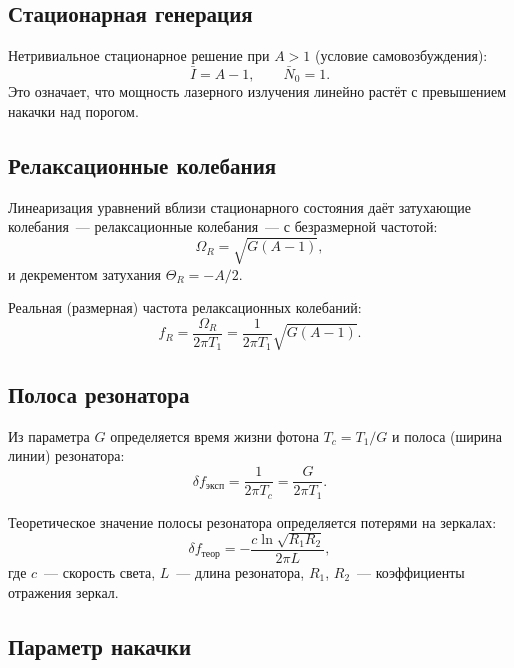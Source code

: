 \documentclass[12pt,a4paper]{article}
\begin{document}
\subsection{Стационарная генерация}

Нетривиальное стационарное решение при $A > 1$ (условие самовозбуждения):
\begin{equation}
  \bar{I} = A - 1, \qquad \bar{N}_0 = 1.
  \label{eq:stationary}
\end{equation}
Это означает, что мощность лазерного излучения линейно растёт с превышением
накачки над порогом.

\subsection{Релаксационные колебания}

Линеаризация уравнений вблизи стационарного состояния даёт затухающие
колебания~--- релаксационные колебания~--- с безразмерной частотой:
\begin{equation}
  \Omega_R = \sqrt{G(A-1)},
  \label{eq:OmegaR}
\end{equation}
и декрементом затухания $\Theta_R = -A/2$.

Реальная (размерная) частота релаксационных колебаний:
\begin{equation}
  f_R = \frac{\Omega_R}{2\pi T_1} = \frac{1}{2\pi T_1}\sqrt{G(A-1)}.
  \label{eq:fR}
\end{equation}

\subsection{Полоса резонатора}

Из параметра $G$ определяется время жизни фотона $T_c = T_1/G$ и полоса
(ширина линии) резонатора:
\begin{equation}
  \delta f_\text{эксп} = \frac{1}{2\pi T_c} = \frac{G}{2\pi T_1}.
  \label{eq:deltaf}
\end{equation}

Теоретическое значение полосы резонатора определяется потерями на зеркалах:
\begin{equation}
  \delta f_\text{теор} = -\frac{c\ln\sqrt{R_1 R_2}}{2\pi L},
  \label{eq:deltaf_teor}
\end{equation}
где $c$~--- скорость света, $L$~--- длина резонатора, $R_1$, $R_2$~---
коэффициенты отражения зеркал.

\subsection{Параметр накачки}
\end{document}
